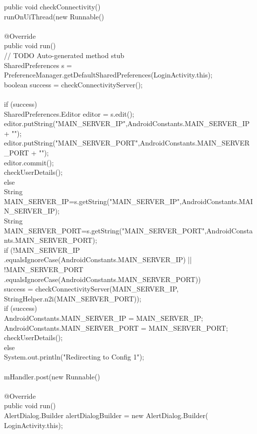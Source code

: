 \documentclass[12pt,a4paper]{article}
\begin{document}
\hspace{0.7 cm}public void checkConnectivity() {\\
		runOnUiThread(new Runnable() {\\
\\
			@Override\\
			public void run() {\\
				// TODO Auto-generated method stub\\
				SharedPreferences s = PreferenceManager.getDefaultSharedPreferences(LoginActivity.this);\\

				boolean success = checkConnectivityServer();\\
				\\
				if (success) {\\
					SharedPreferences.Editor editor = s.edit();\\
					editor.putString("MAIN_SERVER_IP",AndroidConstants.MAIN_SERVER_IP + "");\\
					editor.putString("MAIN_SERVER_PORT",AndroidConstants.MAIN_SERVER_PORT + "");\\
					editor.commit();\\
					checkUserDetails();\\

				} else {\\

					String MAIN_SERVER_IP=s.getString("MAIN_SERVER_IP",AndroidConstants.MAIN_SERVER_IP);\\
					String MAIN_SERVER_PORT=s.getString("MAIN_SERVER_PORT",AndroidConstants.MAIN_SERVER_PORT);\\
					if (!MAIN_SERVER_IP
							.equalsIgnoreCase(AndroidConstants.MAIN_SERVER_IP)
							|| !MAIN_SERVER_PORT
									.equalsIgnoreCase(AndroidConstants.MAIN_SERVER_PORT)) {\\
						success = checkConnectivityServer(MAIN_SERVER_IP,
								StringHelper.n2i(MAIN_SERVER_PORT));\\
						if (success) {\\
							AndroidConstants.MAIN_SERVER_IP = MAIN_SERVER_IP;\\
							AndroidConstants.MAIN_SERVER_PORT = MAIN_SERVER_PORT;\\
							checkUserDetails();\\
						} else {\\
							System.out.println("Redirecting to Config 1");\\
\\
							mHandler.post(new Runnable() {\\
\\
								@Override\\
								public void run() {\\
									AlertDialog.Builder alertDialogBuilder = new AlertDialog.Builder(
											LoginActivity.this);\\

}}}}}}}}
\end{document}
